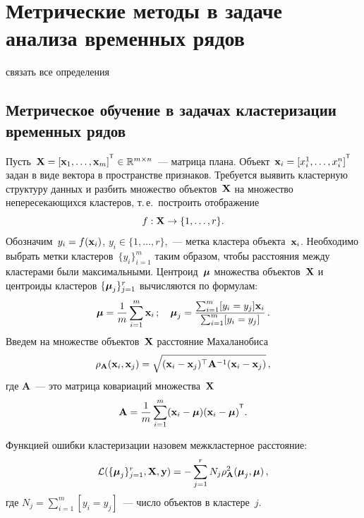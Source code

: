 \chapter{Метрические методы в задаче анализа временных рядов}
\label{ch:metric_learning}

{\color{red} связать все определения}

\section{Метрическое обучение в задачах кластеризации временных рядов}
Пусть~$\bX = [\bx_1, \dots, \bx_m]^{\T} \in \mathbb{R}^{m \times n}$~--- матрица плана.
Объект~$\bx_i = [x_i^1, \ldots, x_i^n]^{\T}$ задан в виде вектора в пространстве признаков.
Требуется выявить кластерную структуру данных и разбить множество объектов~$\mathbf{X}$ на множество непересекающихся кластеров,
т.\,е.\ построить отображение
\[
f: \mathbf{X} \to \{1, \dots, r\}.
\]
Обозначим~$y_i = f (\mathbf{x}_i)$, $y_i \in \{1, \ldots, r\}$,~--- метка кластера объекта~$\mathbf{x}_i$.
Необходимо выбрать метки кластеров~$\{y_i\}_{i=1}^m$ таким образом, чтобы расстояния между кластерами были максимальными.
Центроид~$\boldsymbol{\mu}$ множества объектов~$\mathbf{X}$ и центроиды кластеров $\{\boldsymbol{\mu}_j\}_{j=1}^r$ вычисляются по формулам:
\begin{equation}
\label{mu}
\boldsymbol{\mu} =\frac{1}{m} \sum_{i=1}^m\mathbf{x}_i\,; \quad
\boldsymbol{\mu}_j =\frac{ \sum_{i=1}^m [y_i = y_j]\mathbf{x}_i } {\sum_{i=1}^m [y_i = y_j]}\,.
\end{equation}
Введем на множестве объектов~$\mathbf{X}$ расстояние Махаланобиса
\begin{equation}
\label{metric}
\rho_{\mathbf{A}} (\mathbf{x}_i, \mathbf{x}_j) = \sqrt{(\mathbf{x}_i - \mathbf{x}_j)^{\top} \mathbf{A}^{-1} (\mathbf{x}_i - \mathbf{x}_j)}\,,
\end{equation}
где $\mathbf{A}$~--- это матрица ковариаций множества~$\mathbf{X}$
\begin{equation}
\label{covMatrix}
\bA = \frac{1}{m} \sum_{i=1}^m(\bx_i - \bmu)(\bx_i - \bmu)^{\T}.
\end{equation}
\begin{definition}
	Функцией ошибки кластеризации назовем межкластерное расстояние:
	\begin{equation}
	\mathcal{L}(\{\boldsymbol{\mu}_j\}_{j=1}^r, \mathbf{X}, \mathbf{y})= - \sum_{j=1}^r N_j \rho_{\mathbf{A}}^2(\boldsymbol{\mu}_j, \boldsymbol{\mu})\,,
	\label{eq:cluster_error_function}
	\end{equation}
	где $N_j = \sum_{i=1}^m [y_i = y_j]$~--- число объектов в кластере~$j$.
\end{definition}

